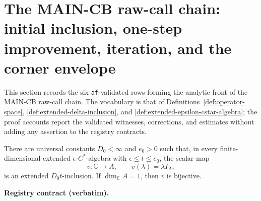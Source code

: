 \section{The MAIN-CB raw-call chain: initial inclusion, one-step improvement, iteration, and the corner envelope}\label{sec:maincb-raw-call-chain}

This section records the six \texttt{af}-validated rows forming the analytic front of the
MAIN-CB raw-call chain.  The vocabulary is that of Definitions~\ref{def:operator-space},
\ref{def:extended-delta-inclusion}, and \ref{def:extended-epsilon-cstar-algebra}; the
proof accounts report the validated witnesses, corrections, and estimates without adding
any assertion to the registry contracts.

\begin{lemma}\label{lem:maincb-initial-raw-inclusion}
There are universal constants $D_{0}<\infty$ and $e_{0}>0$ such that, in every
finite-dimensional extended $\epsilon$-$C^{*}$-algebra with
$\epsilon\le t\le e_{0}$, the scalar map
\[
  v:\mathbb C\longrightarrow A,\qquad v(\lambda)=\lambda I_{A},
\]
is an extended $D_{0}t$-inclusion.  If $\dim_{\mathbb C}A=1$, then $v$ is bijective.
\end{lemma}

\noindent\textbf{Registry contract (verbatim).}

